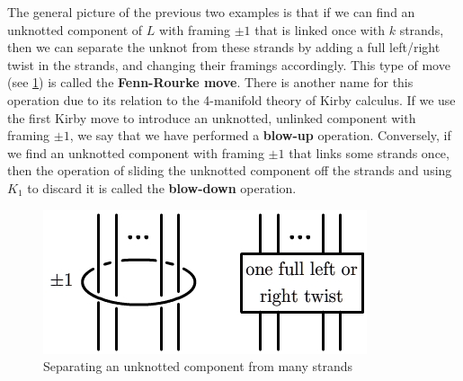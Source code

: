 \begin{example}
\label{the fenn-rourke move}
The general picture of the previous two examples is that if we can find an unknotted component of $L$ with framing $\pm 1$ that is linked once with $k$ strands, then we can separate the unknot from these strands by adding a full left/right twist in the strands, and changing their framings accordingly. This type of move (see \cref{fenn-rourke-3}) is called the \textbf{Fenn-Rourke move}. There is another name for this operation due to its relation to the 4-manifold theory of Kirby calculus. If we use the first Kirby move to introduce an unknotted, unlinked component with framing $\pm 1$, we say that we have performed a \textbf{blow-up} operation. Conversely, if we find an unknotted component with framing $\pm 1$ that links some strands once, then the operation of sliding the unknotted component off the strands and using $K_1$ to discard it is called the \textbf{blow-down} operation.

\begin{figure}[tb]
\centering
\includegraphics[scale=.6]{graphics/fenn-rourke-3}
\caption{Separating an unknotted component from many strands}
\label{fenn-rourke-3}
\end{figure}
\end{example}

